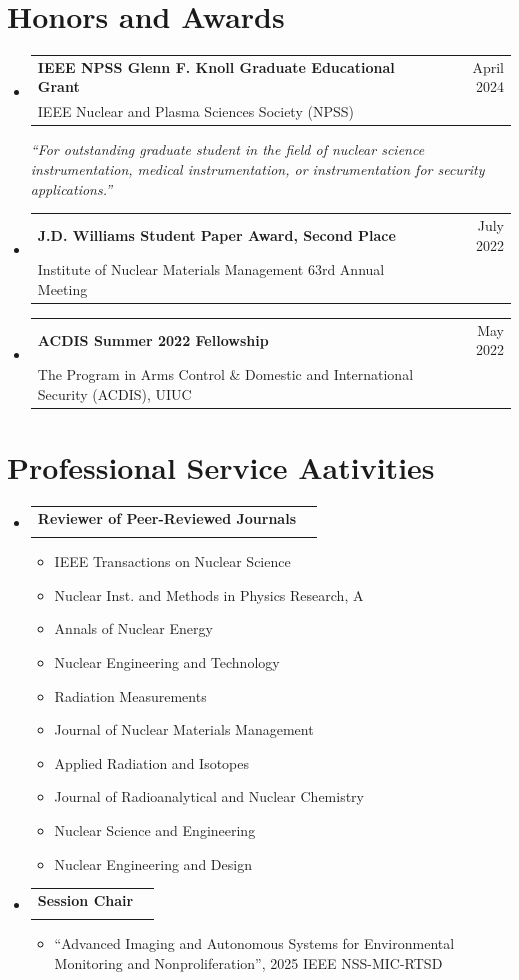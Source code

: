 \documentclass[letterpaper,11pt]{article} %
\makeatletter
\newcommand{\CVItem}[1]{
  \item\small{
    {#1 \vspace{-2pt}}
  }
}
\newcommand{\CVSubheading}[4]{
  \vspace{-2pt}\item
    \begin{tabular*}{0.97\textwidth}[t]{l@{\extracolsep{\fill}}r}
      \textbf{#1} & \footnotesize #2 \\
      \footnotesize #3 & \footnotesize #4 \\
    \end{tabular*}\vspace{-7pt}
}
\newcommand{\CVSubHeadingListStart}{\begin{itemize}[leftmargin=0.5cm, label={}]}
\newcommand{\CVSubHeadingListEnd}{\end{itemize}}
\newcommand{\CVItemListStart}{\begin{itemize}[rightmargin=\dimexpr\linewidth-15cm-\leftmargin\relax]}
\newcommand{\CVItemListEnd}{\end{itemize}\vspace{-5pt}}
\makeatother
\begin{document}
\section{Honors and Awards}
\CVSubHeadingListStart
    \CVSubheading
          {IEEE NPSS Glenn F. Knoll Graduate Educational Grant}{April 2024}
          {IEEE Nuclear and Plasma Sciences Society (NPSS)}{}

    \textit{``For outstanding graduate student in the field of nuclear science instrumentation, medical instrumentation, or instrumentation for security applications.''}
    \CVSubheading
          {J.D. Williams Student Paper Award, Second Place}{July 2022}
          {Institute of Nuclear Materials Management 63rd Annual Meeting}{}
    \CVSubheading
          {ACDIS Summer 2022 Fellowship}{May 2022}
          {The Program in Arms Control \& Domestic and International Security (ACDIS), UIUC}{}
\CVSubHeadingListEnd

\section{Professional Service Aativities}
\CVSubHeadingListStart
    \CVSubheading
    {Reviewer of Peer-Reviewed Journals}{ }
    { }{}\vspace{-1em}
    \CVItemListStart
      \CVItem{IEEE Transactions on Nuclear Science}
      \CVItem{Nuclear Inst. and Methods in Physics Research, A}
      \CVItem{Annals of Nuclear Energy}
      \CVItem{Nuclear Engineering and Technology}
      \CVItem{Radiation Measurements}
      \CVItem{Journal of Nuclear Materials Management}
      \CVItem{Applied Radiation and Isotopes}
      \CVItem{Journal of Radioanalytical and Nuclear Chemistry}
      \CVItem{Nuclear Science and Engineering}
      \CVItem{Nuclear Engineering and Design}
    \CVItemListEnd
    \CVSubheading
      {Session Chair}{}
      {}{}\vspace{-1em}
      \CVItemListStart
        \CVItem{``Advanced Imaging and Autonomous Systems for Environmental Monitoring and Nonproliferation'', 2025 IEEE NSS-MIC-RTSD}
      \CVItemListEnd
  \CVSubHeadingListEnd
\end{document}
